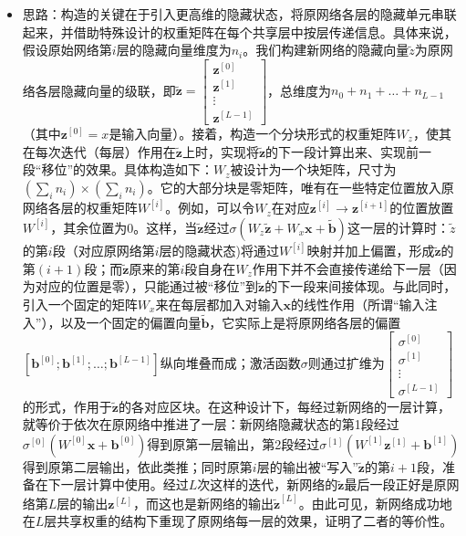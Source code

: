 \documentclass[cn,hazy,cyan,11pt,normal]{elegantnote}
\begin{document}
    \begin{itemize}
        \item 思路：构造的关键在于引入更高维的隐藏状态，将原网络各层的隐藏单元串联起来，并借助特殊设计的权重矩阵在每个共享层中按层传递信息。具体来说，假设原始网络第$i$层的隐藏向量维度为$n_i$。我们构建新网络的隐藏向量$\tilde{z}$为原网络各层隐藏向量的级联，即$\tilde{\mathbf{z}}=\begin{bmatrix}\mathbf{z}^{[0]}\\\mathbf{z}^{[1]}\\\vdots\\\mathbf{z}^{[L-1]}\end{bmatrix}$，总维度为$n_0+n_1+\ldots+n_{L-1}$（其中$\mathbf{z}^{[0]}=x$是输入向量）。接着，构造一个分块形式的权重矩阵$W_z$，使其在每次迭代（每层）作用在$\tilde{\mathbf{z}}$上时，实现将$\tilde{\mathbf{z}}$的下一段计算出来、实现前一段“移位”的效果。具体构造如下：$W_z$被设计为一个块矩阵，尺寸为$\left(\sum_i n_i\right) \times \left(\sum_i n_i\right)$。它的大部分块是零矩阵，唯有在一些特定位置放入原网络各层的权重矩阵$W^{[i]}$。例如，可以令$W_z$在对应$\mathbf{z}^{[i]}\rightarrow\mathbf{z}^{[i+1]}$的位置放置$W^{[i]}$，其余位置为0。这样，当$\tilde{\mathbf{z}}$经过$\sigma(W_z \tilde{\mathbf{z}} + W_x\mathbf{x}+ \tilde{\mathbf{b}})$这一层的计算时：$\tilde{z}$的第$i$段（对应原网络第$i$层的隐藏状态)将通过$W^{[i]}$映射并加上偏置，形成$\tilde{\mathbf{z}}$的第$(i+1)$段；而$\tilde{\mathbf{z}}$原来的第$i$段自身在$W_z$作用下并不会直接传递给下一层（因为对应的位置是零），只能通过被“移位”到$\tilde{\mathbf{z}}$的下一段来间接体现。与此同时，引入一个固定的矩阵$W_x$来在每层都加入对输入$\mathbf{x}$的线性作用（所谓“输入注入”），以及一个固定的偏置向量$\tilde{\mathbf{b}}$，它实际上是将原网络各层的偏置$[\mathbf{b}^{[0]}; \mathbf{b}^{[1]}; \ldots; \mathbf{b}^{[L-1]}]$纵向堆叠而成；激活函数$\sigma$则通过扩维为$\begin{bmatrix}\sigma^{[0]}\\\sigma^{[1]}\\\vdots\\\sigma^{[L-1]}\end{bmatrix}$的形式，作用于$\tilde{\mathbf{z}}$的各对应区块。在这种设计下，每经过新网络的一层计算，就等价于依次在原网络中推进了一层：新网络隐藏状态的第1段经过$\sigma^{[0]}(W^{[0]}\mathbf{x} + \mathbf{b}^{[0]})$得到原第一层输出，第2段经过$\sigma^{[1]}(W^{[1]} \mathbf{z}^{[1]} + \mathbf{b}^{[1]})$得到原第二层输出，依此类推；同时原第$i$层的输出被“写入”$\tilde{\mathbf{z}}$的第$i+1$段，准备在下一层计算中使用。经过$L$次这样的迭代，新网络的$\tilde{\mathbf{z}}$最后一段正好是原网络第$L$层的输出$\mathbf{z}^{[L]}$，而这也是新网络的输出$\tilde{\mathbf{z}}^{[L]}$。由此可见，新网络成功地在$L$层共享权重的结构下重现了原网络每一层的效果，证明了二者的等价性。

\end{itemize}
\end{document}
